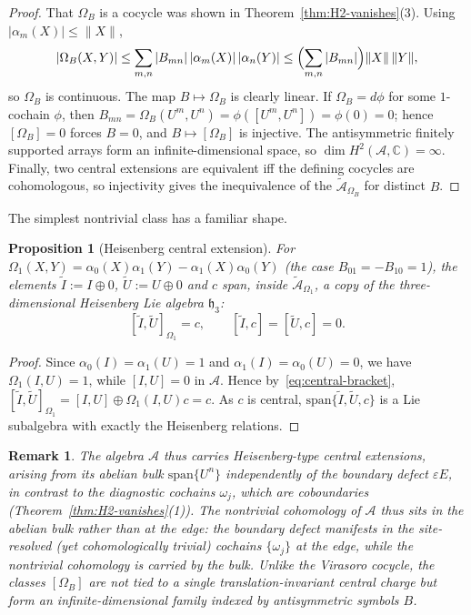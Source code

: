\documentclass[10pt]{amsart}
\newcommand{\1}{{\mathbb{I}}}
\newtheorem{prop}[theorem]{Proposition}
\newtheorem{remark}[theorem]{Remark}
\numberwithin{equation}{section}
\begin{document}
\begin{proof}
That $\Omega_B$ is a cocycle was shown in Theorem~\ref{thm:H2-vanishes}(3). Using
$|\alpha_m(X)|\le\|X\|$,
\[
|\Omega_B(X,Y)|\le\sum_{m,n}|B_{mn}|\,|\alpha_m(X)|\,|\alpha_n(Y)|
\le\Bigl(\sum_{m,n}|B_{mn}|\Bigr)\|X\|\,\|Y\|,
\]
so $\Omega_B$ is continuous. The map $B\mapsto\Omega_B$ is clearly linear. If $\Omega_B=d\phi$ for
some $1$-cochain $\phi$, then $B_{mn}=\Omega_B(U^m,U^n)=\phi([U^m,U^n])=\phi(0)=0$; hence
$[\Omega_B]=0$ forces $B=0$, and $B\mapsto[\Omega_B]$ is injective. The antisymmetric finitely
supported arrays form an infinite-dimensional space, so $\dim H^2(\mathcal{A},\mathbb{C})=\infty$.
Finally, two central extensions are equivalent iff the defining cocycles are cohomologous, so
injectivity gives the inequivalence of the $\widetilde{\mathcal{A}}_{\Omega_B}$ for distinct $B$.
\end{proof}

The simplest nontrivial class has a familiar shape.

\begin{prop}[Heisenberg central extension]\label{prop:heisenberg}
For $\Omega_1(X,Y)=\alpha_0(X)\alpha_1(Y)-\alpha_1(X)\alpha_0(Y)$ (the case
$B_{01}=-B_{10}=1$), the elements $\widetilde I:=I\oplus0$, $\widetilde U:=U\oplus0$ and $c$ span,
inside $\widetilde{\mathcal{A}}_{\Omega_1}$, a copy of the three-dimensional Heisenberg Lie
algebra $\mathfrak{h}_3$:
\[
[\widetilde I,\widetilde U]_{\Omega_1}=c,\qquad [\widetilde I,c]=[\widetilde U,c]=0.
\]
\end{prop}

\begin{proof}
Since $\alpha_0(I)=\alpha_1(U)=1$ and $\alpha_1(I)=\alpha_0(U)=0$, we have $\Omega_1(I,U)=1$,
while $[I,U]=0$ in $\mathcal{A}$. Hence by~\eqref{eq:central-bracket},
$[\widetilde I,\widetilde U]_{\Omega_1}=[I,U]\oplus\Omega_1(I,U)c=c$. As $c$ is central,
$\mathrm{span}\{\widetilde I,\widetilde U,c\}$ is a Lie subalgebra with exactly the
Heisenberg relations.
\end{proof}

\begin{remark}
The algebra $\mathcal{A}$ thus carries Heisenberg-type central extensions, arising from
its abelian bulk $\mathrm{span}\{U^n\}$ \emph{independently of the boundary defect} $\varepsilon E$,
in contrast to the diagnostic cochains $\omega_j$, which are coboundaries
(Theorem~\ref{thm:H2-vanishes}(1)). The nontrivial cohomology of $\mathcal{A}$ thus sits in
the abelian bulk rather than at the edge: the boundary defect manifests in the
\emph{site-resolved} (yet cohomologically trivial) cochains $\{\omega_j\}$ at the edge, while the
nontrivial \emph{cohomology} is carried by the bulk. Unlike the Virasoro cocycle, the classes
$[\Omega_B]$ are not tied to a single translation-invariant central charge but form an
infinite-dimensional family indexed by antisymmetric symbols $B$.
\end{remark}
\end{document}
